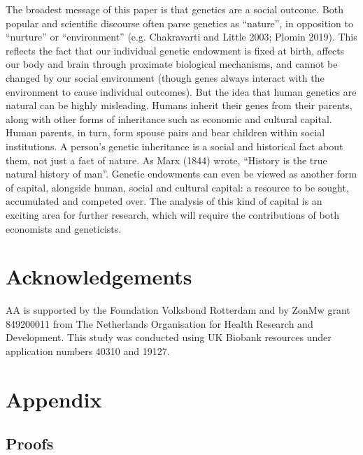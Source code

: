 \documentclass[
]{article}
\theoremstyle{definition}
\theoremstyle{definition}
\theoremstyle{definition}
\theoremstyle{definition}
\theoremstyle{remark}
\begin{document}
The broadest message of this paper is that genetics are a social
outcome. Both popular and scientific discourse often parse genetics as
``nature'', in opposition to ``nurture'' or ``environment'' (e.g. Chakravarti and Little 2003; Plomin 2019). This reflects the fact that
our individual genetic endowment is fixed at birth, affects our body and brain
through proximate biological mechanisms, and cannot be changed by our social
environment (though genes always interact with the environment to cause
individual outcomes). But the idea that human genetics are natural can be highly
misleading. Humans inherit their genes from their parents, along with other
forms of inheritance such as economic and cultural capital. Human parents, in
turn, form spouse pairs and bear children within social institutions. A person's
genetic inheritance is a social and historical fact about them, not just a
fact of nature. As Marx (1844) wrote, ``History is the true natural history of
man''. Genetic endowments can even be viewed as another form of capital,
alongside human, social and cultural capital: a resource to be sought,
accumulated and competed over. The analysis of this kind of capital is an
exciting area for further research, which will require the contributions of both
economists and geneticists.

\hypertarget{acknowledgements}{%
\section{Acknowledgements}\label{acknowledgements}}

AA is supported by the Foundation Volksbond Rotterdam and by ZonMw grant
849200011 from The Netherlands Organisation for Health Research and Development.
This study was conducted using UK Biobank resources under application numbers
40310 and 19127.

\FloatBarrier

\newpage

\hypertarget{appendix}{%
\section{Appendix}\label{appendix}}

\localtableofcontents
\clearpage

\hypertarget{proofs}{%
\subsection{Proofs}\label{proofs}}
\end{document}
